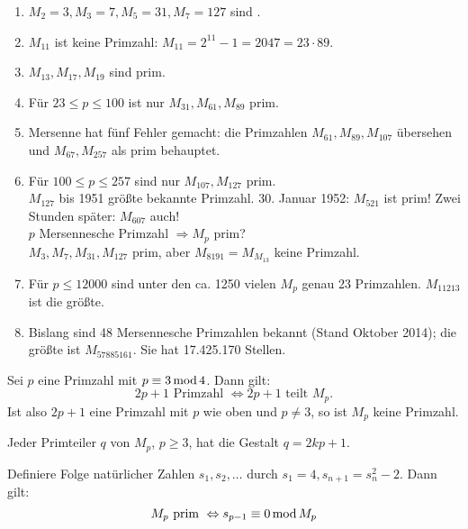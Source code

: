 \begin{enumerate}[(1)]
	\item $M_2 = 3, M_3 = 7, M_5 = 31, M_7 = 127$ sind . 
	\item $M_{11}$ ist keine Primzahl: $M_{11} = 2^{11} - 1 = 2047 = 23 \cdot 89$.
	\item $M_{13}, M_{17}, M_{19}$ sind prim.
	\item Für $23 \leq p \leq 100$ ist nur $M_{31}, M_{61}, M_{89}$ prim.
	\item Mersenne hat fünf Fehler gemacht: die Primzahlen $M_{61}, M_{89}, M_{107}$ übersehen und $M_{67}, M_{257}$ als prim behauptet.
	\item Für $100 \leq p \leq 257$ sind nur $M_{107}, M_{127}$ prim. \\
	$M_{127}$ bis 1951 größte bekannte Primzahl. 30. Januar 1952: $M_{521}$ ist prim! Zwei Stunden später: $M_{607}$ auch! \\
	$p$ Mersennesche Primzahl $\Rightarrow M_p$ prim? \\
	$M_3, M_7, M_{31}, M_{127}$ prim, aber $M_{8191} = M_{M_{13}}$ keine Primzahl.
	\item Für $p \leq 12000$ sind unter den ca. 1250 vielen $M_p$ genau 23 Primzahlen. $M_{11213}$ ist die größte.
	\item Bislang sind 48 Mersennesche Primzahlen bekannt (Stand Oktober 2014); die größte ist $M_{57885161}$. Sie hat 17.425.170 Stellen.
\end{enumerate}

\setcounter{countfalko}{3}
\begin{falko} \label{F7.4}
	Sei $p$ eine Primzahl mit $p \equiv 3 \operatorname{mod} 4$. Dann gilt:
	\[2p + 1 \text{ Primzahl } \Leftrightarrow 2p+1 \text{ teilt } M_p. \]
	Ist also $2p+1$ eine Primzahl mit $p$ wie oben und $p \neq 3$, so ist $M_p$ keine Primzahl.
\end{falko}

	Jeder Primteiler $q$ von $M_p$, $p \geq 3$, hat die Gestalt $q = 2kp + 1$.
	
\begin{falko} \label{F7.5}
	Definiere Folge natürlicher Zahlen $s_1, s_2, \dots$ durch $s_1 = 4, s_{n+1} = s_n^2 - 2$. Dann gilt:
	\[ M_p \text{ prim } \Leftrightarrow s_{p-1} \equiv 0 \operatorname{mod} M_p \]
\end{falko}
\newpage